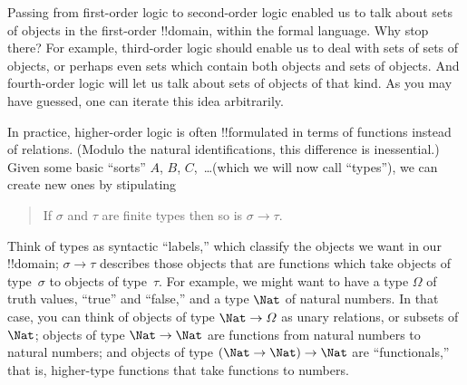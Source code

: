 \documentclass[../../../include/open-logic-section]{subfiles}
\begin{document}


Passing from first-order logic to second-order logic enabled us to
talk about sets of objects in the first-order !!{domain}, within the
formal language. Why stop there? For example, third-order logic should
enable us to deal with sets of sets of objects, or perhaps even sets
which contain both objects and sets of objects. And fourth-order logic
will let us talk about sets of objects of that kind. As you may have
guessed, one can iterate this idea arbitrarily.

In practice, higher-order logic is often !!{formula}ted in terms of
functions instead of relations. (Modulo the natural identifications,
this difference is inessential.) Given some basic ``sorts'' $A$, $B$,
$C$,~\dots (which we will now call ``types''), we can create new ones
by stipulating
\begin{quote}
If $\sigma$ and $\tau$ are finite types then so is $\sigma \to \tau$.
\end{quote}
Think of types as syntactic ``labels,'' which classify the objects we
want in our !!{domain}; $\sigma \to \tau$ describes those objects that
are functions which take objects of type~$\sigma$ to objects of
type~$\tau$. For example, we might want to have a type $\Omega$ of
truth values, ``true'' and ``false,'' and a type $\Nat$ of natural
numbers. In that case, you can think of objects of type $\Nat \to
\Omega$ as unary relations, or subsets of $\Nat$; objects of type
$\Nat \to \Nat$ are functions from natural numbers to natural numbers;
and objects of type $(\Nat \to \Nat) \to \Nat$ are ``functionals,''
that is, higher-type functions that take functions to numbers.
\end{document}
